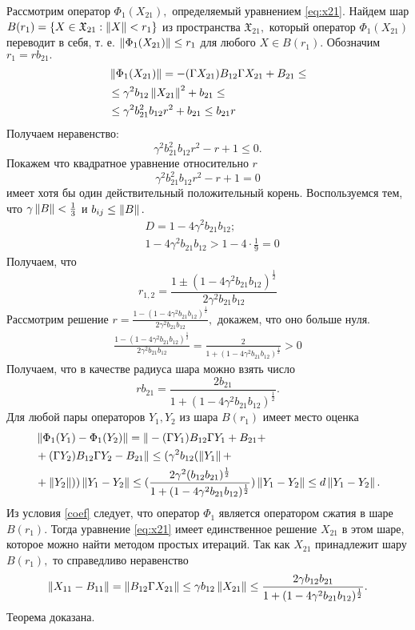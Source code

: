 Рассмотрим оператор $\Phi_1(X_{21}),$ определяемый уравнением \ref{eq:x21}. Найдем шар $B(r_1) = \{ X \in  \mathfrak{X}_{21}: \left\|X\right\| < r_1 \}$ из пространства $ \mathfrak{X}_{21},$ который оператор $\Phi_1(X_{21})$ переводит в себя, т.\! е. $\left\|\Phi_1(X_{21})\right\| \leq r_1$ для любого $X \in B(r_1).$ Обозначим $r_1 = rb_{21}.$
\begin{align*}
&\left\|\Phi_1(X_{21})\right\| = - (\Gamma X_{21})B_{12}\Gamma X_{21} + B_{21} \leq \\
&\leq \gamma^2 b_{12}\left\|X_{21}\right\|^2 + b_{21} \leq \\ 
&\leq \gamma^2 b_{21}^2 b_{12}r^2 + b_{21} \leq b_{21}r
\end{align*}
Получаем неравенство:
$$
\gamma^2 b_{21}^2 b_{12}r^2 - r + 1 \leq 0.
$$
Покажем что квадратное уравнение относительно $r$
$$
\gamma^2 b_{21}^2 b_{12}r^2 - r + 1 = 0
$$
имеет хотя бы один действительный положительный корень. Воспользуемся тем, что $\gamma\left\|B\right\| < \frac{1}{3}$ и $b_{ij} \leq \left\|B\right\|.$
\begin{align*}
&D = 1 - 4\gamma^2 b_{21}b_{12}; \\
&1 - 4\gamma^2 b_{21}b_{12} > 1 - 4\cdot\frac{1}{9} = 0
\end{align*}
Получаем, что 
$$
	r_{1,2} = \frac{1 \pm (1 - 4\gamma^2 b_{21}b_{12})^{\frac{1}{2}}}{2\gamma^2 b_{21}b_{12}}
$$	
Рассмотрим решение $r = \frac{1 - (1 - 4\gamma^2 b_{21}b_{12})^{\frac{1}{2}}}{2\gamma^2 b_{21}b_{12}},$ докажем, что оно больше нуля.
\begin{align*}
\frac{1 - (1 - 4\gamma^2 b_{21}b_{12})^{\frac{1}{2}}}{2\gamma^2 b_{21}b_{12}} = \frac{2}{1 + (1 - 4\gamma^2 b_{21}b_{12})^{\frac{1}{2}}} > 0
\end{align*}
Получаем, что в качестве радиуса шара можно взять число
$$
 rb_{21} = \frac{2b_{21}}{1 + (1 - 4\gamma^2 b_{21}b_{12})^{\frac{1}{2}}}.
$$
Для любой пары операторов $Y_1, Y_2$ из шара $B(r_1)$ имеет место оценка
\begin{align*}
&\left\|\Phi_1(Y_1) - \Phi_1(Y_2)\right\| = \|- (\Gamma Y_1)B_{12}\Gamma Y_1 + B_{21} + \\
& + (\Gamma Y_2)B_{12}\Gamma Y_2 - B_{21}\| \leq (\gamma^2 b_{12}(\left\|Y_1\right\| + \\
& + \left\|Y_2\right\|))\left\|Y_1 - Y_2\right\| \leq (\frac{2\gamma^2 (b_{12}b_{21})^{\frac{1}{2}}}{1 + (1 - 4\gamma^2 b_{21}b_{12})^{\frac{1}{2}}})\left\|Y_1 - Y_2\right\| \leq d\left\|Y_1 - Y_2\right\|.
\end{align*}
Из условия \eqref{coef} следует, что оператор $\Phi_1$ является оператором сжатия в шаре $B(r_1).$ Тогда уравнение \eqref{eq:x21} имеет единственное решение $X_{21}$ в этом шаре, которое можно найти методом простых итераций. Так как $X_{21}$ принадлежит шару $B(r_1),$ то справедливо неравенство
\begin{align*}
\left\|X_{11} - B_{11}\right\| = \left\|B_{12}\Gamma X_{21}\right\| \leq \gamma b_{12} \left\|X_{21}\right\| \leq \frac{2\gamma b_{12}b_{21}}{1 + (1 - 4\gamma^2 b_{21}b_{12})^{\frac{1}{2}}}.
\end{align*}
Теорема доказана.

